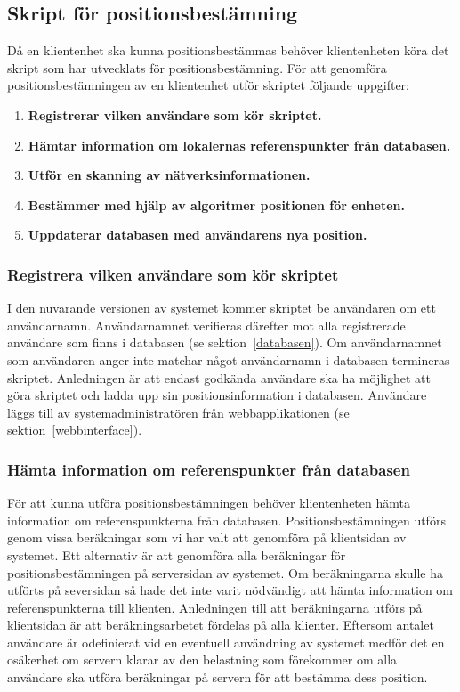 \documentclass[a4paper,12pt]{article}
\begin{document}
 \subsection{Skript för positionsbestämning}
 Då en klientenhet ska kunna positionsbestämmas behöver klientenheten köra det skript som har utvecklats för positionsbestämning. För att genomföra positionsbestämningen av en klientenhet utför skriptet följande uppgifter:
 \begin{enumerate}
   \item \textbf{Registrerar vilken användare som kör skriptet.}
   \item \textbf{Hämtar information om lokalernas referenspunkter från databasen.}
   \item \textbf{Utför en skanning av nätverksinformationen.}
   \item \textbf{Bestämmer med hjälp av algoritmer positionen för enheten.}
   \item \textbf{Uppdaterar databasen med användarens nya position.}
 \end{enumerate}


 \subsubsection{Registrera vilken användare som kör skriptet}
 I den nuvarande versionen av systemet kommer skriptet be användaren om ett användarnamn. Användarnamnet verifieras därefter mot alla registrerade användare som finns i databasen (se sektion~\ref{databasen}). Om användarnamnet som användaren anger inte matchar något användarnamn i databasen termineras skriptet. Anledningen är att endast godkända användare ska ha möjlighet att göra skriptet och ladda upp sin positionsinformation i databasen. Användare läggs till av systemadministratören från webbapplikationen (se sektion~\ref{webbinterface}).

 \subsubsection{Hämta information om referenspunkter från databasen}\label{HamtaInfoDB}
 För att kunna utföra positionsbestämningen behöver klientenheten hämta information om referenspunkterna från databasen. Positionsbestämningen utförs genom vissa beräkningar som vi har valt att genomföra på klientsidan av systemet. Ett alternativ är att genomföra alla beräkningar för positionsbestämningen på serversidan av systemet. Om beräkningarna skulle ha utförts på seversidan så hade det inte varit nödvändigt att hämta information om referenspunkterna till klienten. Anledningen till att beräkningarna utförs på klientsidan är att beräkningsarbetet fördelas på alla klienter. Eftersom antalet användare är odefinierat vid en eventuell användning av systemet medför det en osäkerhet om servern klarar av den belastning som förekommer om alla användare ska utföra beräkningar på servern för att bestämma dess position.
\end{document}
